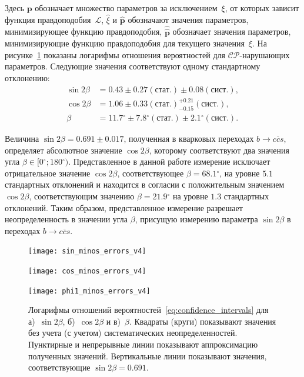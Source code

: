 \documentclass[a4paper,14pt]{extarticle} %
\newcommand{\pphi}{\ensuremath{\beta}\xspace}
\newcommand{\sindbeta}{\ensuremath{\sin{2\pphi}}\xspace}
\newcommand{\cosdbeta}{\ensuremath{\cos{2\pphi}}\xspace}
\newcommand{\btoccs}{\ensuremath{b\to c\overline{c}s}\xspace}
\newcommand{\stat}{\ensuremath{\left({\textrm{стат}.}\right)}\xspace}
\newcommand{\syst}{\ensuremath{\left({\textrm{сист}.}\right)}\xspace}
\newcommand{\vecp}{\ensuremath{\mathbf{p}}\xspace}
\newcommand{\mcl}{\ensuremath{\mathcal{L}}\xspace}
\newcommand{\cpconj}{\ensuremath{\mathcal{CP}}\xspace}
\newcommand{\grad}{\ensuremath{^{\circ}}\xspace}
\begin{document}
Здесь \vecp обозначает множество параметров за исключением~$\xi$, от которых зависит функция правдоподобия~$\mcl$, $\hat{\xi}$ и $\hat{\vecp}$ обозначают значения параметров, минимизирующее функцию правдоподобия, $\hat{\hat{\vecp}}$ обозначает значения параметров, минимизирующие функцию правдоподобия для текущего значения~$\xi$.  На рисунке~\ref{fig:lambda} показаны логарифмы отношения вероятностей для \cpconj-нарушающих параметров.  Следующие значения соответствуют одному стандартному отклонению:
 \begin{equation}\label{eq:final_results}
 \begin{split}
  \sindbeta &= 0.43     \pm 0.27\stat    \pm 0.08    \syst,\\
  \cosdbeta &= 1.06     \pm 0.33\stat^{+0.21}_{-0.15}\syst,\\
  \pphi     &= 11.7\grad\pm 7.8\grad\stat\pm 2.1\grad\syst.
 \end{split}
 \end{equation}

Величина $\sindbeta=0.691\pm0.017$, полученная в кварковых переходах \btoccs, определяет абсолютное значение \cosdbeta, которому соответствуют два значения угла $\pphi\in[0\grad; 180\grad)$.  Представленное в данной работе измерение исключает отрицательное значение \cosdbeta, соответствующее $\pphi = 68.1\grad$, на уровне $5.1$ стандартных отклонений и находится в согласии с положительным значением \cosdbeta, соответствующим значению $\pphi = 21.9\grad$ на уровне $1.3$ стандартных отклонений.  Таким образом, представленное измерение разрешает неопределенность в значении угла \pphi, присущую измерению параметра \sindbeta в переходах \btoccs.

\begin{figure}[htb]
 \begin{minipage}[b]{0.32\textwidth}
  \centering
  \texttt{[image: sin\_minos\_errors\_v4]}
  \subcaption{}
 \end{minipage}
 \begin{minipage}[b]{0.32\textwidth}
  \centering
  \texttt{[image: cos\_minos\_errors\_v4]}
  \subcaption{}
 \end{minipage}
 \begin{minipage}[b]{0.32\textwidth}
  \centering
  \texttt{[image: phi1\_minos\_errors\_v4]}
  \subcaption{}
 \end{minipage}
  \caption{Логарифмы отношений вероятностей~\eqref{eq:confidence_intervals} для а)~\sindbeta, б)~\cosdbeta и в)~\pphi. Квадраты (круги) показывают значения без учета (с учетом) систематических неопределенностей.  Пунктирные и непрерывные линии показывают аппроксимацию полученных значений.  Вертикальные линии показывают значения, соответствующие $\sindbeta=0.691$.  }
  \label{fig:lambda}
\end{figure}
\end{document}
